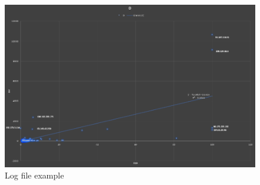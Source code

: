 \begin{figure}[H] \label{Log file example}
    \centering
    \includegraphics[width=170mm]{Apdenix/Graphdata.png}
    \caption{Log file example}
    \label{fig:my_label}
\end{figure}